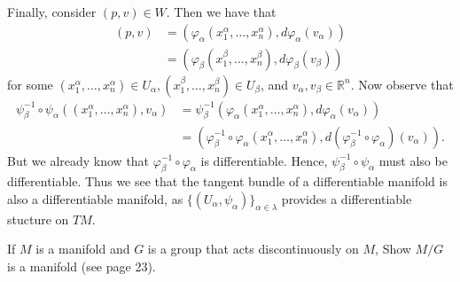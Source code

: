 \documentclass[12pt,letterpaper,boxed]{math_hw_pset}
\newcommand{\rr}{\mathbb{R}}
\renewcommand{\phi}{\varphi}
\begin{document}
\begin{solution}
    Finally, consider $(p, v) \in W$. Then we have that 
    \begin{align*}
        (p, v) &= (\phi_\alpha(x_1^\alpha, \dots, x_n^\alpha), d\phi_\alpha(v_\alpha))\\
        &= (\phi_\beta(x_1^\beta, \dots, x_n^\beta), d\phi_\beta(v_\beta))
    \end{align*}
    for some $(x_1^\alpha, \dots, x_n^\alpha) \in U_\alpha, (x_1^\beta, \dots, x_n^\beta) \in U_\beta$, 
    and $v_\alpha, v_\beta \in \rr^n$. Now observe that 
    \begin{align*}
        \psi_\beta^{-1}\circ \psi_\alpha((x_1^\alpha, \dots, x_n^\alpha), v_\alpha)
        &= \psi_\beta^{-1}(\phi_\alpha(x_1^\alpha, \dots, x_n^\alpha), d\phi_\alpha(v_\alpha))\\
        &= (\phi_\beta^{-1}\circ \phi_\alpha(x_1^\alpha, \dots, x_n^\alpha), d(\phi_\beta^{-1}\circ\phi_\alpha)(v_\alpha)).
    \end{align*}
    But we already know that $\phi_\beta^{-1}\circ\phi_\alpha$ is differentiable. 
    Hence, $\psi_\beta^{-1}\circ\psi_\alpha$ must also be differentiable. Thus we see that  
    the tangent bundle of a differentiable manifold is also a differentiable manifold, as 
    $\{(U_\alpha, \psi_\alpha)\}_{\alpha \in \lambda}$ provides a differentiable stucture on $TM$. 
 
\end{solution}

\newpage
\begin{exercise}[Problem 4.]
    If $M$ is a manifold and $G$ is a group that acts discontinuously on 
    $M$, Show $M/G$ is a manifold (see page 23).
\end{exercise}
\end{document}
